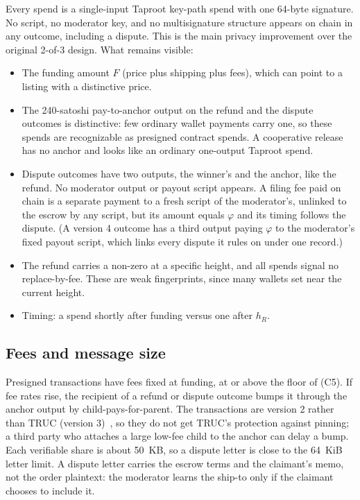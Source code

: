 Every spend is a single-input Taproot key-path spend with one 64-byte signature. No script, no moderator key, and no multisignature structure appears on chain in any outcome, including a dispute. This is the main privacy improvement over the original 2-of-3 design. What remains visible:
\begin{itemize}
  \item The funding amount $F$ (price plus shipping plus fees), which can point to a listing with a distinctive price.
  \item The 240-satoshi pay-to-anchor output on the refund and the dispute outcomes is distinctive: few ordinary wallet payments carry one, so these spends are recognizable as presigned contract spends. A cooperative release has no anchor and looks like an ordinary one-output Taproot spend.
  \item Dispute outcomes have two outputs, the winner's and the anchor, like the refund. No moderator output or payout script appears. A filing fee paid on chain is a separate payment to a fresh script of the moderator's, unlinked to the escrow by any script, but its amount equals $\varphi$ and its timing follows the dispute. (A version 4 outcome has a third output paying $\varphi$ to the moderator's fixed payout script, which links every dispute it rules on under one record.)
  \item The refund carries a non-zero  at a specific height, and all spends signal no replace-by-fee. These are weak fingerprints, since many wallets set  near the current height.
  \item Timing: a spend shortly after funding versus one after $h_R$.
\end{itemize}

\subsection{Fees and message size}

Presigned transactions have fees fixed at funding, at or above the floor of (C5). If fee rates rise, the recipient of a refund or dispute outcome bumps it through the anchor output by child-pays-for-parent. The transactions are version 2 rather than TRUC (version 3)~\citep{bip431}, so they do not get TRUC's protection against pinning; a third party who attaches a large low-fee child to the anchor can delay a bump. Each verifiable share is about 50~KB, so a dispute letter is close to the 64~KiB letter limit. A dispute letter carries the escrow terms and the claimant's memo, not the order plaintext: the moderator learns the ship-to only if the claimant chooses to include it.

